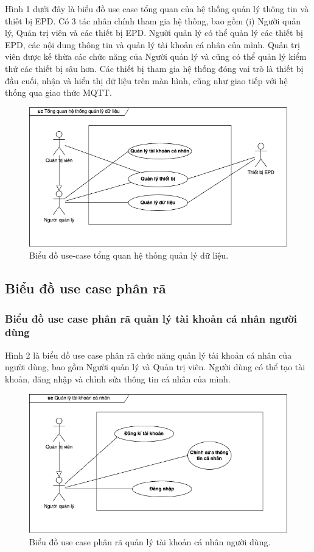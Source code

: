 \documentclass[../DoAn.tex]{subfiles}
\begin{document}
Hình 1 dưới đây là biểu đồ use case tổng quan của hệ thống quản lý thông tin và thiết bị EPD. Có 3 tác nhân chính tham gia hệ thống, bao gồm (i) Người quản lý, Quản trị viên và các thiết bị EPD. Người quản lý có thể quản lý các thiết bị EPD, các nội dung thông tin và quản lý tài khoản cá nhân của mình. Quản trị viên được kế thừa các chức năng của Người quản lý và cũng có thể quản lý kiểm thử các thiết bị sâu hơn. Các thiết bị tham gia hệ thống đóng vai trò là thiết bị đầu cuối, nhận và hiển thị dữ liệu trên màn hình, cũng như giao tiếp với hệ thống qua giao thức MQTT.
\begin{figure}[h]
    \centering
    \includegraphics[scale=0.6]{imgs/diagrams/uc_general.png}
    \caption{Biểu đồ use-case tổng quan hệ thống quản lý dữ liệu.}
    \label{fig:uc-general}
\end{figure}


\subsection{Biểu đồ use case phân rã}
\label{subsection:2.2.2}
\subsubsection{Biểu đồ use case phân rã quản lý tài khoản cá nhân người dùng}

Hình 2 là biểu đồ use case phân rã chức năng quản lý tài khoản cá nhân của người dùng, bao gồm Người quản lý và Quản trị viên. Người dùng có thể tạo tài khoản, đăng nhập và chỉnh sửa thông tin cá nhân của mình.
\begin{figure}[h]
    \centering
    \includegraphics[scale=0.6]{imgs/diagrams/uc_account.png}
    \caption{Biểu đồ use case phân rã quản lý tài khoản cá nhân người dùng.}
    \label{fig:uc-general}
\end{figure}
\end{document}

